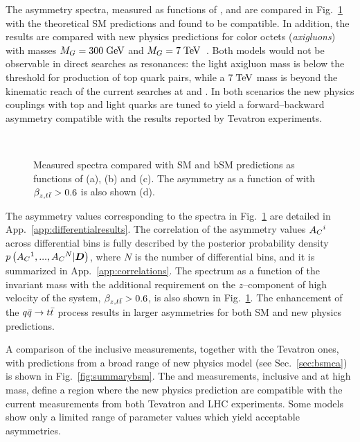 The asymmetry spectra, measured as functions of
\mtt{}, \pttt{} and \ytt{} are compared in Fig.~\ref{fig:unfac_diff}
with the theoretical SM predictions and found to be compatible. 
In addition, the results are compared with new physics predictions for
color octets ({\it axigluons}) with masses $M_G=300 \; \mathrm{GeV}{}$ and $M_G=7
\; \mathrm{TeV}{}$~\cite{AguilarSaavedra:2011ci}. Both models would not
be observable in direct searches as \ttbar{} resonances: the light
axigluon mass is below the threshold for production of top quark
pairs, while a $7 \; \mathrm{TeV}$ mass is beyond the kinematic reach of the
current searches at \seventev{} and \eighttev{}. In both scenarios
the new physics couplings with top and light quarks are tuned to yield a
forward--backward asymmetry compatible with the results reported by
Tevatron experiments.

\begin{figure}[!htb]\centering
   \quad
   \\
   \quad
  \caption{Measured \ac{} spectra compared with SM and bSM predictions
    as functions of \mtt{} (a), \pttt{} (b) and \ytt{} (c). The
    asymmetry as a function of \mtt{} with $\beta_{z,t\bar{t}}{}>0.6$ is also
    shown (d).}
  \label{fig:unfac_diff}
\end{figure}

The asymmetry values corresponding to the spectra in
Fig.~\ref{fig:unfac_diff} are detailed in App.~\ref{app:differentialresults}.
The correlation of the asymmetry values $A_C{}^i$ across differential bins is
fully described by the posterior probability density
$p\left(A_C{}^1,...,A_C{}^N|\boldsymbol{D}{}\right)$, where
$N$ is the number of differential bins, and it is summarized in
App.~\ref{app:correlations}.
The \ac{} spectrum as a function of the \ttbar{} invariant mass \mtt{}
with the additional requirement on the $z$--component of high velocity
of the \ttbar{} system, $\beta_{z,t\bar{t}}{}>0.6$, is also shown in
Fig.~\ref{fig:unfac_diff}. The enhancement of the $q\bar{q}{}\to t\bar{t}{}$
process results in larger asymmetries for both SM and new physics
predictions.

A comparison of the inclusive \ac{} measurements, together with the Tevatron
\afb{} ones, with predictions from a broad range of new physics model
(see Sec.~\ref{sec:bsmca}) is shown in Fig.~\ref{fig:summarybsm}. The
\ac{} and \afb{} measurements, inclusive and at high \mtt{} mass,
define a region where the new physics prediction are compatible with
the current measurements from both Tevatron and LHC experiments.
Some models show only a limited range of parameter values which yield acceptable
asymmetries.

